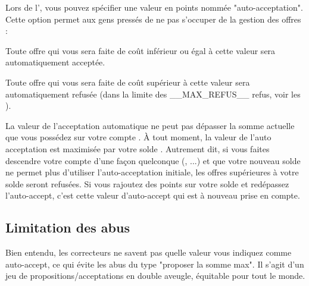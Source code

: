 Lors de l', vous pouvez spécifier une valeur en points nommée "auto-acceptation". Cette option permet aux gens pressés de ne pas s'occuper de la gestion des offres :
\item Toute offre qui vous sera faite de coût inférieur ou égal à cette valeur sera automatiquement acceptée.
\item Toute offre qui vous sera faite de coût supérieur à cette valeur sera automatiquement refusée (dans la limite des __MAX_REFUS__ refus, voir les ).

La valeur de l'acceptation automatique ne peut pas dépasser la somme actuelle que vous possédez sur votre compte \eDevoir.
À tout moment, la valeur de l'auto acceptation est maximisée par votre solde \eDevoir.
Autrement dit, si vous faites descendre votre compte d'une façon quelconque (, ...) et que votre nouveau solde ne permet plus d'utiliser l'auto-acceptation initiale, les offres supérieures à votre solde seront refusées.
Si vous rajoutez des points sur votre solde et redépassez l'auto-accept, c'est cette valeur d'auto-accept qui est à nouveau prise en compte.

\subsection{Limitation des abus}
Bien entendu, les correcteurs ne savent pas quelle valeur vous indiquez comme auto-accept, ce qui évite les abus du type "proposer la somme max". Il s'agit d'un jeu de propositions/acceptations en double aveugle, équitable pour tout le monde.